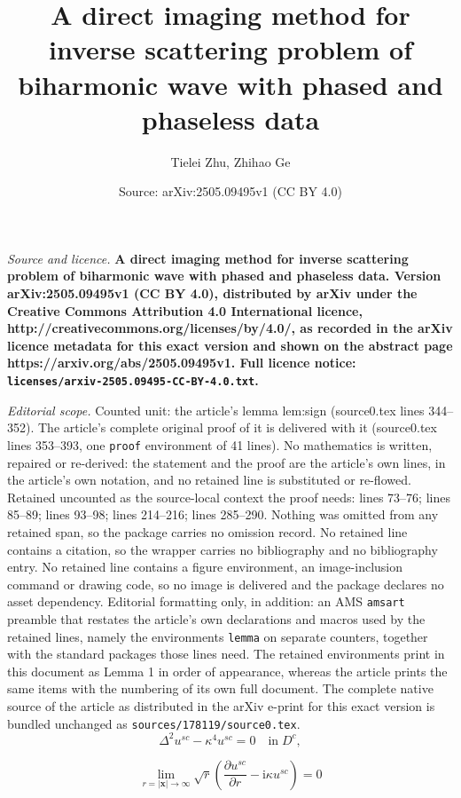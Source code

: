\documentclass[10pt,a4paper]{amsart}
\title{\bfseries A direct imaging method for inverse scattering problem of biharmonic wave with phased and phaseless data}
\author{Tielei Zhu, Zhihao Ge}
\date{Source: arXiv:2505.09495v1 (CC BY 4.0)}
\begin{document}
\maketitle

\noindent\emph{Source and licence.} \bfseries A direct imaging method for inverse scattering problem of biharmonic wave with phased and phaseless data. Version arXiv:2505.09495v1 (CC BY 4.0), distributed by arXiv under the Creative Commons Attribution 4.0 International licence, http://creativecommons.org/licenses/by/4.0/, as recorded in the arXiv licence metadata for this exact version and shown on the abstract page https://arxiv.org/abs/2505.09495v1. Full licence notice: \texttt{licenses/arxiv-2505.09495-CC-BY-4.0.txt}.\par\smallskip

\noindent\textit{Editorial scope.} Counted unit: the article's lemma lem:sign (source0.tex lines 344--352). The article's complete original proof of it is delivered with it (source0.tex lines 353--393, one \texttt{proof} environment of 41 lines). No mathematics is written, repaired or re-derived: the statement and the proof are the article's own lines, in the article's own notation, and no retained line is substituted or re-flowed.  Retained uncounted as the source-local context the proof needs: lines 73--76; lines 85--89; lines 93--98; lines 214--216; lines 285--290.  Nothing was omitted from any retained span, so the package carries no omission record.  No retained line contains a citation, so the wrapper carries no bibliography and no bibliography entry.  No retained line contains a figure environment, an image-inclusion command or drawing code, so no image is delivered and the package declares no asset dependency.  Editorial formatting only, in addition: an AMS \texttt{amsart} preamble that restates the article's own declarations and macros used by the retained lines, namely the environments \texttt{lemma} on separate counters, together with the standard packages those lines need.  The retained environments print in this document as Lemma 1 in order of appearance, whereas the article prints the same items with the numbering of its own full document.  The complete native source of the article as distributed in the arXiv e-print for this exact version is bundled unchanged as \texttt{sources/178119/source0.tex}.
\begin{equation}
\label{eq:bi}
\Delta^2u^{sc}-\kappa^4u^{sc}=0 \quad\mathrm{in}\; D^{c},
\end{equation}

\begin{equation}
\label{eq:radiation}
\lim\limits_{r=|\bm{x}|\to\infty}\sqrt{r}\left(\frac{\partial u^{sc}}{\partial r}
  -\mathrm{i}\kappa u^{sc}\right)=0
\end{equation}
\end{document}
